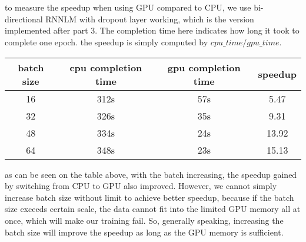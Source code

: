 \documentclass[11pt]{article}
\begin{document}
\part{}
\leavevmode
\indent to measure the speedup when using GPU compared to CPU, we use bi-directional RNNLM with dropout layer working, which is the version implemented after part 3. The completion time here indicates how long it took to complete one epoch. the speedup is simply computed by $cpu\_time / gpu\_time$.
\begin{flushleft}
 \begin{tabular}{||c c c c||} 
 \hline
 batch size & cpu completion time & gpu completion time & speedup \\ [0.5ex] 
 \hline\hline
 16& 312s & 57s & 5.47 \\ 
 \hline
 32 & 326s & 35s & 9.31 \\
 \hline
 48 & 334s & 24s & 13.92 \\
 \hline
 64 & 348s & 23s & 15.13 \\
 \hline
\end{tabular}
\end{flushleft}
\leavevmode
\newline
\indent as can be seen on the table above, with the batch increasing, the speedup gained by switching from CPU to GPU also improved. However, we cannot simply increase batch size without limit to achieve better speedup, because if the batch size exceeds certain scale, the data cannot fit into the limited GPU memory all at once, which will make our training fail. So, generally speaking, increasing the batch size will improve the speedup as long as the GPU memory is sufficient.
\end{document}
